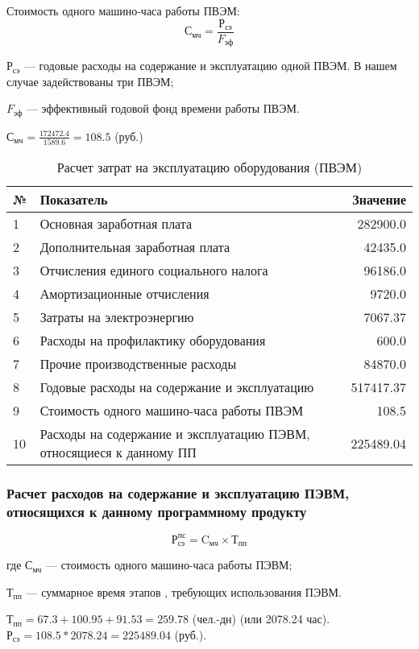 Стоимость одного машино-часа работы ПВЭМ:
\begin{equation}                                                   
	\textrm{С}_\textrm{мч} = \frac{\textrm{Р}_\textrm{сэ}}{F_\textrm{эф}}
\end{equation}
\begin{ESKDexplanation}
	\item{} $\textrm{Р}_\textrm{сэ}$ --- годовые расходы на содержание и эксплуатацию одной ПВЭМ. В нашем случае задействованы три ПВЭМ;
	\item{} $F_\textrm{эф}$ --- эффективный годовой фонд времени работы ПВЭМ.
\end{ESKDexplanation}
$\textrm{С}_\textrm{мч} = \frac{172472.4}{1589.6} = 108.5$ (руб.)

\begin{table}
\caption{Расчет затрат на эксплуатацию оборудования (ПВЭМ)}
\begin{tabular}{|l|p{13cm}|r|}
\hline{}
№ & Показатель & Значение \\
\hline{}
1 & Основная заработная плата & 282900.0 \\
\hline{}
2 & Дополнительная заработная плата & 42435.0 \\
\hline{}
3 & Отчисления единого социального налога & 96186.0 \\
\hline{}
4 & Амортизационные отчисления & 9720.0 \\
\hline{}
5 & Затраты на электроэнергию & 7067.37 \\
\hline{}
6 & Расходы на профилактику оборудования & 600.0 \\
\hline{}
7 & Прочие производственные расходы & 84870.0 \\
\hline{}
8 & Годовые расходы на содержание и эксплуатацию & 517417.37 \\
\hline{}
9 & Стоимость одного машино-часа работы ПВЭМ & 108.5 \\
\hline{}
10 & Расходы на содержание и эксплуатацию ПЭВМ, относящиеся к данному ПП & 225489.04 \\
\hline
\end{tabular}
\label{table:staffExp}
\end{table}



\subsubsection{Расчет расходов на содержание и эксплуатацию ПЭВМ, относящихся к данному программному продукту}
\begin{equation}
\textrm{Р}_\textrm{сэ}^{\textrm{пс}} = \textrm{C}_\textrm{мч} \times{} \textrm{Т}_\textrm{пп}
\end{equation}
\begin{ESKDexplanation}
	\item[где ]{} $\textrm{С}_\textrm{мч}$ --- стоимость одного машино-часа работы ПЭВМ;
	\item{} $\textrm{Т}_\textrm{пп}$ --- суммарное время этапов , требующих использования ПЭВМ.
\end{ESKDexplanation}
$\textrm{Т}_\textrm{пп} =  67.3 + 100.95 + 91.53 =259 .78$ (чел.-дн) (или 2078.24 час).
$\textrm{Р}_\textrm{сэ} =  108.5 * 2078.24 = 225489.04$ (руб.).

